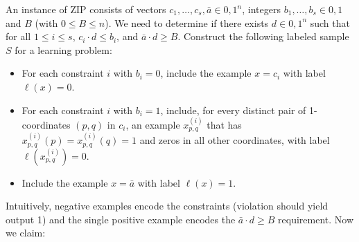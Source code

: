 \documentclass[11pt]{article}
\DeclareMathOperator{\1}{\mathbbm{1}}
\begin{document}
An instance of ZIP consists of vectors $c_1,\dots,c_s, \bar{a}\in{0,1}^n$, integers $b_1,\dots,b_s\in{0,1}$ and $B$ (with $0\le B\le n$). We need to determine if there exists $d\in{0,1}^n$ such that for all $1\le i\le s$, $c_i\cdot d\le b_i$, and $\bar{a}\cdot d \ge B$. Construct the following labeled sample $S$ for a learning problem:
\begin{itemize}
    \item For each constraint $i$ with $b_i = 0$, include the example $x = c_i$ with label $\ell(x)=0$.
    \item For each constraint $i$ with $b_i = 1$, include, for every distinct pair of 1-coordinates $(p,q)$ in $c_i$, an example $x_{p,q}^{(i)}$ that has $x_{p,q}^{(i)}(p)=x_{p,q}^{(i)}(q)=1$ and zeros in all other coordinates, with label $\ell(x_{p,q}^{(i)}) = 0$.
    \item Include the example $x=\bar{a}$ with label $\ell(x)=1$.
\end{itemize}
Intuitively, negative examples encode the constraints (violation should yield output 1) and the single positive example encodes the $\bar{a}\cdot d\ge B$ requirement. Now we claim:
\end{document}

